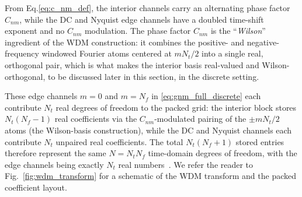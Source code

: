 \documentclass[twocolumn,preprintnumbers,
  superscriptaddress,
  nofootinbib,
  amsmath,
  amssymb,
  aps,
  prd,
  colorlinks=true,
  linkcolor=blue,
  urlcolor=blue,
  citecolor=blue,
  anchorcolor=blue
]{revtex4-2}
\begin{document}

From Eq.\eqref{eq:c_nm_def}, the interior channels carry an alternating phase factor $C_{nm}$, while the DC and Nyquist edge channels have a doubled time-shift exponent and no $C_{nm}$ modulation. The phase factor $C_{nm}$ is the
``\emph{Wilson}'' ingredient of the WDM construction: it combines the
positive- and negative-frequency windowed Fourier atoms centered at $mN_t/2$ into a single real, orthogonal pair, which is what
makes the interior basis real-valued and Wilson-orthogonal, to be discussed later in this section, in the
discrete setting. 

These edge channels $m = 0$ and $m = N_f$ in \eqref{eq:gnm_full_discrete} each contribute $N_t$ real degrees of freedom to
the packed grid: the interior block stores $N_t(N_f{-}1)$ real
coefficients via the $C_{nm}$-modulated pairing of the
$\pm mN_t/2$ atoms (the Wilson-basis construction), while the DC
and Nyquist channels each contribute $N_t$ unpaired real coefficients.
The total $N_t(N_f{+}1)$ stored entries therefore represent the same
$N=N_tN_f$ time-domain degrees of freedom, with the edge channels
being exactly $N_t$ real numbers~\cite{Necula_2012,Cornish:2020odn}. 
We refer the reader to Fig.~\ref{fig:wdm_transform} for a schematic of the WDM transform and the packed coefficient layout.  %
\end{document}
